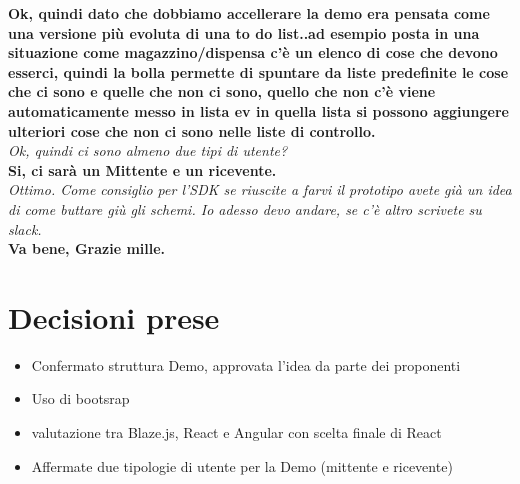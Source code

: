 \documentclass[10 pt,a4paper, openany]{article}
\begin{document}
\textbf{Ok, quindi dato che dobbiamo accellerare la demo era pensata come una versione più evoluta di una to do list..ad esempio posta in una situazione come magazzino/dispensa c'è un elenco di cose che devono esserci, quindi la bolla permette di spuntare da liste predefinite le cose che ci sono e quelle che non ci sono, quello che non c'è viene automaticamente messo in lista ev in quella lista si possono aggiungere ulteriori cose che non ci sono nelle liste di controllo.}\\
\textit{Ok, quindi ci sono almeno due tipi di utente?}\\

\textbf{Si, ci sarà un Mittente e un ricevente.}\\
\textit{Ottimo. Come consiglio per l'SDK se riuscite a farvi il prototipo avete già un idea di come buttare giù gli schemi. Io adesso devo andare, se c'è altro scrivete su slack.}\\

\textbf{Va bene, Grazie mille.}\\

\section{Decisioni prese}
\begin{itemize}
	\item Confermato struttura Demo, approvata l'idea da parte dei proponenti
	\item Uso di bootsrap
	\item valutazione tra Blaze.js, React e Angular con scelta finale di React
	\item Affermate due tipologie di utente per la Demo (mittente e ricevente)
	
\end{itemize}
\end{document}

